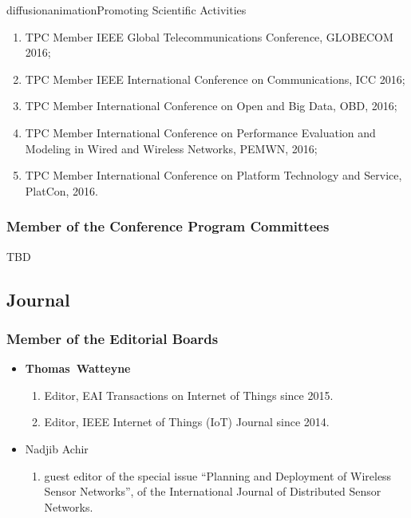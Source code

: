 \documentclass{ra2016}
\newcommand{\thomas}           {\textbf{Thomas~Watteyne}}
\begin{document}
\begin{module}{diffusion}{animation}{Promoting Scientific Activities}
\begin{itemize}
\begin{enumerate}
            \item TPC Member IEEE Global Telecommunications Conference, GLOBECOM 2016;
            \item TPC Member IEEE International Conference on Communications, ICC 2016;
            \item TPC Member International Conference on Open and Big Data, OBD, 2016;
	      \item TPC Member International Conference on Performance Evaluation and Modeling in Wired and Wireless Networks, PEMWN, 2016;
            \item TPC Member International Conference on Platform Technology and Service, PlatCon, 2016.
        \end{enumerate}
    
\end{itemize}

    
    \subsubsection{Member of the Conference Program Committees}
    
    TBD 

    
\subsection{Journal}
    \subsubsection{Member of the Editorial Boards}
    \begin{itemize}
    \item \thomas
        \begin{enumerate}
            \item Editor, EAI Transactions on Internet of Things since 2015.
            \item Editor, IEEE Internet of Things (IoT) Journal since 2014.
        \end{enumerate}
    \item Nadjib Achir
        \begin{enumerate}
            \item guest editor  of the special issue ``Planning and Deployment of Wireless Sensor Networks'', of the International Journal of Distributed Sensor Networks.
        \end{enumerate}
\end{itemize}


\end{module}
\end{document}
